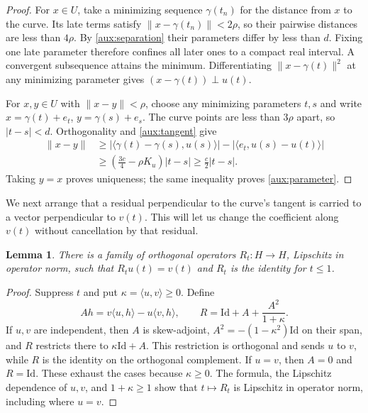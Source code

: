 \documentclass[11pt]{article}
\newcommand{\norm}[1]{\lVert #1\rVert}
\newcommand{\ip}[2]{\langle #1,#2\rangle}
\newtheorem{lemma}[theorem]{Lemma}
\theoremstyle{definition}
\numberwithin{equation}{section}
\begin{document}
\begin{proof}
For $x\in U$, take a minimizing sequence $\gamma(t_n)$ for the
distance from $x$ to the curve. Its late terms satisfy
$\norm{x-\gamma(t_n)}<2\rho$, so their pairwise distances are less
than $4\rho$. By \eqref{aux:separation} their parameters differ by
less than $d$. Fixing one late parameter therefore confines all later
ones to a compact real interval. A convergent subsequence attains the
minimum. Differentiating $\norm{x-\gamma(t)}^2$ at any minimizing
parameter gives $(x-\gamma(t))\perp u(t)$.

For $x,y\in U$ with $\norm{x-y}<\rho$, choose any minimizing
parameters $t,s$ and write $x=\gamma(t)+e_t$,
$y=\gamma(s)+e_s$. The curve points are less than $3\rho$ apart,
so $|t-s|<d$. Orthogonality and \eqref{aux:tangent} give
\begin{align*}
 \norm{x-y}
 &\ge |\ip{\gamma(t)-\gamma(s)}{u(s)}|
       -|\ip{e_t}{u(s)-u(t)}|\\
 &\ge\left(\frac{3c}{4}-\rho K_u\right)|t-s|
 \ge\frac c2|t-s|.
\end{align*}
Taking $y=x$ proves uniqueness; the same inequality proves
\eqref{aux:parameter}.
\end{proof}

We next arrange that a residual perpendicular to the curve's tangent
is carried to a vector perpendicular to $v(t)$. This will let us change
the coefficient along $v(t)$ without cancellation by that residual.

\begin{lemma}\label{aux:rotation}
There is a family of orthogonal operators $R_t:H\to H$, Lipschitz
in operator norm, such that $R_tu(t)=v(t)$ and $R_t$ is the identity
for $t\le1$.
\end{lemma}

\begin{proof}
Suppress $t$ and put $\kappa=\ip{u}{v}\ge0$. Define
\[
 Ah=v\ip{u}{h}-u\ip{v}{h},
 \qquad R=\mathrm{Id}+A+\frac{A^2}{1+\kappa}.
\]
If $u,v$ are independent, then $A$ is skew-adjoint,
$A^2=-(1-\kappa^2)\mathrm{Id}$ on their span, and $R$ restricts there
to $\kappa\mathrm{Id}+A$. This restriction is orthogonal and sends
$u$ to $v$, while $R$ is the identity on the orthogonal complement.
If $u=v$, then $A=0$ and $R=\mathrm{Id}$. These exhaust the cases
because $\kappa\ge0$. The formula, the Lipschitz dependence of
$u,v$, and $1+\kappa\ge1$ show that $t\mapsto R_t$ is Lipschitz
in operator norm, including where $u=v$.
\end{proof}
\end{document}
